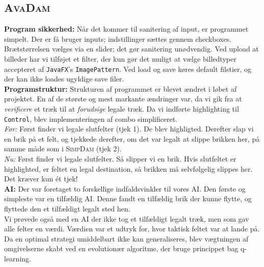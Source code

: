\subsection{\textsc{AvaDam}}\label{sec:evaAva}

\textbf{Program sikkerhed:} 
Når det kommer til sanitering af input, er programmet simpelt. Der er få bruger inputs; indstillinger sættes gennem checkboxes. Brætstørrelsen vælges via en slider; det gør sanitering unødvendig. Ved upload at billeder har vi tilføjet et filter, der kun gør det muligt at vælge billedtyper accepteret af \texttt{JavaFX}'s \texttt{ImagePattern}. Ved load og save køres default filstier, og der kan ikke loades ugyldige save filer. \\

\textbf{Programstruktur:} 
Strukturen af programmet er blevet ændret i løbet af projektet. En af de største og mest markante ændringer var, da vi gik fra at \textit{verificere} et træk til at \textit{forudsige} legale træk. Da vi indførte highlighting til \texttt{Control}, blev implementeringen af combo simplificeret.  \\

\textit{Før:} Først finder vi legale slutfelter (tjek 1). De blev highligted. Derefter slap vi en brik på et felt, og tjekkede derefter, om det var legalt at slippe brikken her, på samme måde som i \textsc{SimpDam} (tjek 2).\\

\textit{Nu:} Først finder vi legale slutfelter. Så slipper vi en brik. Hvis slutfeltet er highlighted, er feltet en legal destination, så brikken må selvfølgelig slippes her. Det kræver kun ét tjek!\\

\textbf{AI:} Der var foretaget to forskellige indfaldsvinkler til vores AI. Den første og simpleste var en tilfældig AI. Denne fandt en tilfældig brik der kunne flytte, og flyttede den et tilfældigt legalt sted hen. \\

Vi prøvede også med en AI der ikke tog et tilfældigt legalt træk, men som gav alle felter en værdi.
Værdien var et udtryk for, hvor taktisk feltet var at lande på. Da en optimal strategi umiddelbart ikke kan generaliseres, blev vægtningen af omgivelserne skabt ved en evolutionær algoritme, der bruge princippet bag q-learning. \\

